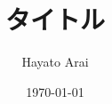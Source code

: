 \documentclass[uplatex,a4paper,dvipdfmx]{jsarticle}
\title{タイトル}
\author{Hayato Arai}
\date{\today}
\theoremstyle{definition}
\begin{document}
\maketitle
\section{}




\end{document}

